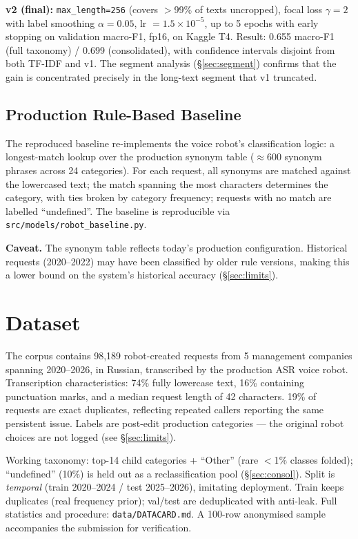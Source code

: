 \documentclass[11pt]{article}
\begin{document}
\textbf{v2 (final):} \texttt{max\_length=256} (covers $>$99\% of texts
uncropped), focal loss $\gamma{=}2$ with label smoothing $\alpha{=}0.05$,
lr $= 1.5{\times}10^{-5}$, up to 5 epochs with early stopping on validation
macro-F1, fp16, on Kaggle T4. Result: 0.655 macro-F1 (full taxonomy) /
0.699 (consolidated), with confidence intervals disjoint from both TF-IDF
and v1. The segment analysis (\S\ref{sec:segment}) confirms that the gain is
concentrated precisely in the long-text segment that v1 truncated.

\subsection{Production Rule-Based Baseline}
The reproduced baseline re-implements the voice robot's classification logic:
a longest-match lookup over the production synonym table ($\approx$600 synonym
phrases across 24 categories). For each request, all synonyms are matched
against the lowercased text; the match spanning the most characters determines
the category, with ties broken by category frequency; requests with no match
are labelled ``undefined''. The baseline is reproducible via
\texttt{src/models/robot\_baseline.py}.

\textbf{Caveat.} The synonym table reflects today's production configuration.
Historical requests (2020--2022) may have been classified by older rule
versions, making this a lower bound on the system's historical accuracy
(\S\ref{sec:limits}).

\section{Dataset}

The corpus contains 98{,}189 robot-created requests from 5 management
companies spanning 2020--2026, in Russian, transcribed by the production ASR
voice robot. Transcription characteristics: 74\% fully lowercase text, 16\%
containing punctuation marks, and a median request length of 42 characters.
19\% of requests are exact duplicates, reflecting repeated callers reporting
the same persistent issue. Labels are post-edit production categories ---
the original robot choices are not logged (see \S\ref{sec:limits}).

Working taxonomy: top-14 child categories + ``Other'' (rare $<$1\% classes
folded); ``undefined'' (10\%) is held out as a reclassification pool
(\S\ref{sec:consol}). Split is \emph{temporal} (train 2020--2024 / test
2025--2026), imitating deployment. Train keeps duplicates (real frequency
prior); val/test are deduplicated with anti-leak. Full statistics and
procedure: \texttt{data/DATACARD.md}. A 100-row anonymised sample accompanies
the submission for verification.
\end{document}
